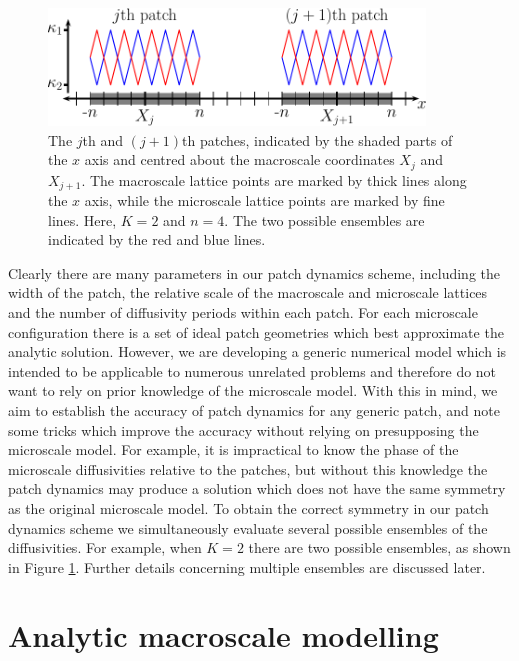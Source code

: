 \documentclass[12pt,a4paper]{article}
\begin{document}
\begin{figure}
\begin{center}
\includegraphics[width=10cm]{zigzagk3}
\caption{The $j$th and $(j+1)$th patches, indicated by the shaded parts of the $x$ axis and centred about the macroscale coordinates $X_j$ and $X_{j+1}$. The macroscale lattice points are marked by thick lines along the $x$ axis, while the microscale lattice points are marked by fine lines.
Here, $K=2$ and $n=4$. The two possible ensembles are indicated by the red and blue lines.}
\label{fig:zigzag}
\end{center}
\end{figure}

Clearly there are many parameters in our patch dynamics scheme, including the width of the patch, the relative scale of the macroscale and microscale lattices and the number of diffusivity periods within each patch. For each microscale configuration there is a set of ideal patch geometries which best approximate the analytic solution. However, we are developing a generic numerical model which is intended to be applicable to numerous unrelated problems and therefore do not want to rely on prior knowledge of the microscale model. With this in mind, we aim to establish the accuracy of patch dynamics for any generic patch, and note some tricks which improve the accuracy without relying on presupposing the microscale model. For example, it is impractical to know the phase of the microscale diffusivities relative to the patches, but without this knowledge the patch dynamics may produce a solution which does not have the same symmetry as the original microscale model. To obtain the correct symmetry in our patch dynamics scheme we simultaneously evaluate several possible ensembles of the diffusivities. For example, when $K=2$ there are two possible ensembles, as shown in Figure \ref{fig:zigzag}. Further details concerning multiple ensembles are discussed later. 


\section{Analytic macroscale modelling}
\label{sec:analytic}
\end{document}
